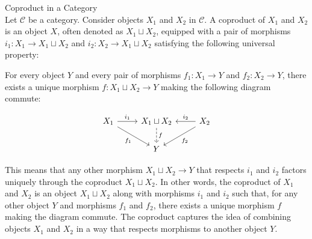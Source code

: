 \begin{definition}{Coproduct in a Category}\\
Let $\mathcal{C}$ be a category. Consider objects $X_1$ and $X_2$ in $\mathcal{C}$. A coproduct of $X_1$ and $X_2$ is an object $X$, often denoted as $X_1 \sqcup X_2$, equipped with a pair of morphisms $i_1: X_1 \to X_1 \sqcup X_2$ and $i_2: X_2 \to X_1 \sqcup X_2$ satisfying the following universal property:

For every object $Y$ and every pair of morphisms $f_1: X_1 \to Y$ and $f_2: X_2 \to Y$, there exists a unique morphism $f: X_1 \sqcup X_2 \to Y$ making the following diagram commute:

\[
\begin{tikzcd}
	X_1 \arrow[r, "i_1"] \arrow[rd, "f_1"'] & X_1 \sqcup X_2 \arrow[d, "f", dashed] & X_2 \arrow[l, "i_2"'] \arrow[ld, "f_2"] \\
	& Y &
\end{tikzcd}
\]

This means that any other morphism $X_1 \sqcup X_2 \to Y$ that respects $i_1$ and $i_2$ factors uniquely through the coproduct $X_1 \sqcup X_2$.
In other words, the coproduct of $X_1$ and $X_2$ is an object $X_1 \sqcup X_2$ along with morphisms $i_1$ and $i_2$ such that, for any other object $Y$ and morphisms $f_1$ and $f_2$, there exists a unique morphism $f$ making the diagram commute. The coproduct captures the idea of combining objects $X_1$ and $X_2$ in a way that respects morphisms to another object $Y$.
\end{definition}
\\ 

